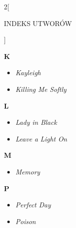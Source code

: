\documentclass[a4paper]{report}
\begin{document}
\begin{multicols*}{2}[\begin{Huge}INDEKS UTWORÓW\end{Huge}\vspace{1cm}]
\begin{minipage}{\columnwidth}
\end{minipage}
\begin{minipage}{\columnwidth}
\begin{Large}
		\textbf{K}
	\end{Large} 
	\begin{itemize}[topsep=6pt, after=\vspace{5mm}, leftmargin=0mm]
		\itemsep0em
		\item[]\textit{Kayleigh}  \\
		\item[]  \textit{Killing Me Softly}  \\
	\end{itemize}
\end{minipage}
\begin{minipage}{\columnwidth}
\begin{Large}
		\textbf{L}
	\end{Large} 
	\begin{itemize}[topsep=6pt, after=\vspace{5mm}, leftmargin=0mm]
		\itemsep0em
		\item[]\textit{Lady in Black}  \\
		\item[]  \textit{Leave a Light On}  \\
	\end{itemize}
\end{minipage}
\begin{minipage}{\columnwidth}
\begin{Large}
		\textbf{M}
	\end{Large} 
	\begin{itemize}[topsep=6pt, after=\vspace{5mm}, leftmargin=0mm]
		\itemsep0em
		\item[]\textit{Memory}  \\
	\end{itemize}
\end{minipage}
\begin{minipage}{\columnwidth}
\begin{Large}
		\textbf{P}
	\end{Large} 
	\begin{itemize}[topsep=6pt, after=\vspace{5mm}, leftmargin=0mm]
		\itemsep0em
		\item[]\textit{Perfect Day}  \\
		\item[]  \textit{Poison}  \\

\end{itemize}
\end{minipage}
\end{multicols*}
\end{document}
